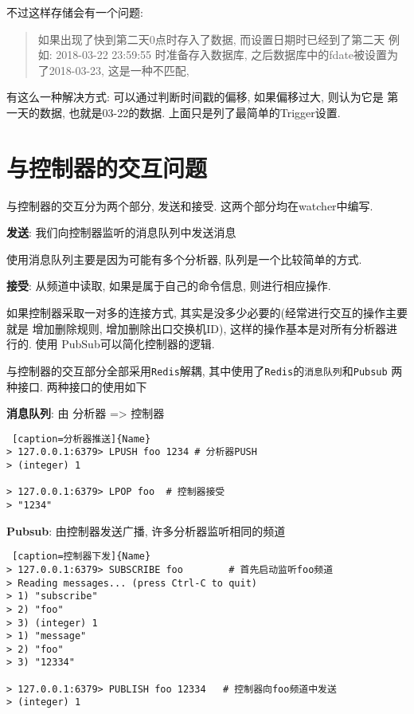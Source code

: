 不过这样存储会有一个问题:

\begin{quote}
如果出现了快到第二天0点时存入了数据, 而设置日期时已经到了第二天 例如:
2018-03-22 23:59:55 时准备存入数据库,
之后数据库中的fdate被设置为了2018-03-23, 这是一种不匹配,
\end{quote}

有这么一种解决方式: 可以通过判断时间戳的偏移, 如果偏移过大, 则认为它是
第一天的数据, 也就是03-22的数据. 上面只是列了最简单的Trigger设置.

\section{与控制器的交互问题}

与控制器的交互分为两个部分, 发送和接受. 这两个部分均在watcher中编写.

\textbf{发送}: 我们向控制器监听的消息队列中发送消息

使用消息队列主要是因为可能有多个分析器, 队列是一个比较简单的方式.

\textbf{接受}: 从频道中读取, 如果是属于自己的命令信息, 则进行相应操作.

如果控制器采取一对多的连接方式,
其实是没多少必要的(经常进行交互的操作主要就是 增加删除规则,
增加删除出口交换机ID), 这样的操作基本是对所有分析器进行的. 使用
PubSub可以简化控制器的逻辑.

与控制器的交互部分全部采用\texttt{Redis}解耦,
其中使用了\texttt{Redis}的\texttt{消息队列}和\texttt{Pubsub} 两种接口.
两种接口的使用如下

\textbf{消息队列}: 由 分析器 =\textgreater{} 控制器

\begin{lstlisting} [caption=分析器推送]{Name}
> 127.0.0.1:6379> LPUSH foo 1234 # 分析器PUSH
> (integer) 1

> 127.0.0.1:6379> LPOP foo  # 控制器接受
> "1234"
\end{lstlisting}

\textbf{Pubsub}: 由控制器发送广播, 许多分析器监听相同的频道


\begin{lstlisting} [caption=控制器下发]{Name}
> 127.0.0.1:6379> SUBSCRIBE foo        # 首先启动监听foo频道 
> Reading messages... (press Ctrl-C to quit)
> 1) "subscribe"
> 2) "foo"
> 3) (integer) 1
> 1) "message"
> 2) "foo"
> 3) "12334"

> 127.0.0.1:6379> PUBLISH foo 12334   # 控制器向foo频道中发送
> (integer) 1
\end{lstlisting}

